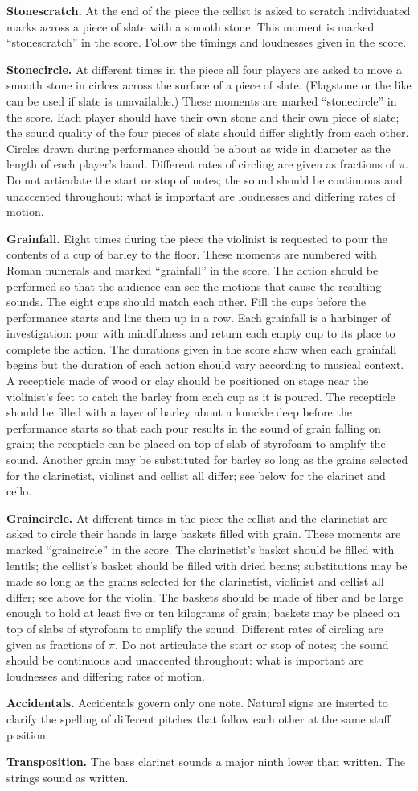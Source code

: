 \textbf{Stonescratch.} At the end of the piece the cellist is asked to scratch
individuated marks across a piece of slate with a smooth stone. This moment is
marked ``stonescratch'' in the score. Follow the timings and loudnesses given
in the score.

\textbf{Stonecircle.} At different times in the piece all four players are
asked to move a smooth stone in cirlces across the surface of a piece of slate.
(Flagstone or the like can be used if slate is unavailable.) These moments are
marked ``stonecircle'' in the score. Each player should have their own stone
and their own piece of slate; the sound quality of the four pieces of slate
should differ slightly from each other. Circles drawn during performance should
be about as wide in diameter as the length of each player's hand. Different
rates of circling are given as fractions of $\pi$. Do not articulate the start
or stop of notes; the sound should be continuous and unaccented throughout:
what is important are loudnesses and differing rates of motion.

\textbf{Grainfall.} Eight times during the piece the violinist is requested to
pour the contents of a cup of barley to the floor. These moments are numbered
with Roman numerals and marked ``grainfall'' in the score. The action should be
performed so that the audience can see the motions that cause the resulting
sounds. The eight cups should match each other. Fill the cups before the
performance starts and line them up in a row. Each grainfall is a harbinger of
investigation: pour with mindfulness and return each empty cup to its place to
complete the action. The durations given in the score show when each grainfall
begins but the duration of each action should vary according to musical
context. A recepticle made of wood or clay should be positioned on stage near
the violinist's feet to catch the barley from each cup as it is poured. The
recepticle should be filled with a layer of barley about a knuckle deep before
the performance starts so that each pour results in the sound of grain falling
on grain; the recepticle can be placed on top of slab of styrofoam to amplify
the sound. Another grain may be substituted for barley so long as the grains
selected for the clarinetist, violinst and cellist all differ; see below for
the clarinet and cello.

\textbf{Graincircle.} At different times in the piece the cellist and the
clarinetist are asked to circle their hands in large baskets filled with grain.
These moments are marked ``graincircle'' in the score. The clarinetist's basket
should be filled with lentils; the cellist's basket should be filled with dried
beans; substitutions may be made so long as the grains selected for the
clarinetist, violinist and cellist all differ; see above for the violin. The
baskets should be made of fiber and be large enough to hold at least five or
ten kilograms of grain; baskets may be placed on top of slabs of styrofoam to
amplify the sound. Different rates of circling are given as fractions of $\pi$.
Do not articulate the start or stop of notes; the sound should be continuous
and unaccented throughout: what is important are loudnesses and differing rates
of motion.

\textbf{Accidentals.} Accidentals govern only one note. Natural signs are
inserted to clarify the spelling of different pitches that follow each other at
the same staff position.

\textbf{Transposition.} The bass clarinet sounds a major ninth lower than
written. The strings sound as written.
